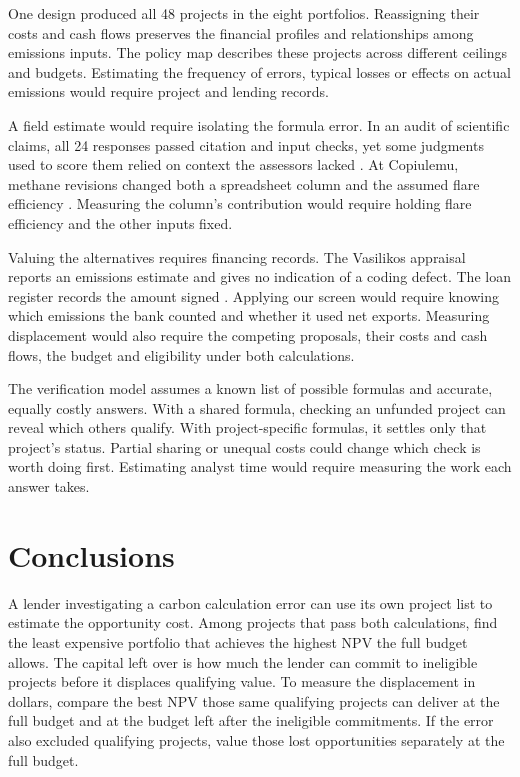 \documentclass[ijfs,article,submit,oneauthor]{Definitions/mdpi}
\begin{document}
One design produced all 48 projects in the eight portfolios. Reassigning their costs and cash flows preserves the financial profiles and relationships among emissions inputs. The policy map describes these projects across different ceilings and budgets. Estimating the frequency of errors, typical losses or effects on actual emissions would require project and lending records.

A field estimate would require isolating the formula error. In an audit of scientific claims, all 24 responses passed citation and input checks, yet some judgments used to score them relied on context the assessors lacked \citep{versions}. At Copiulemu, methane revisions changed both a spreadsheet column and the assumed flare efficiency \citep[pp.~9--11, 14]{sgs}. Measuring the column's contribution would require holding flare efficiency and the other inputs fixed.

Valuing the alternatives requires financing records. The Vasilikos appraisal reports an emissions estimate and gives no indication of a coding defect. The loan register records the amount signed \citep{eibscore,eibloan}. Applying our screen would require knowing which emissions the bank counted and whether it used net exports. Measuring displacement would also require the competing proposals, their costs and cash flows, the budget and eligibility under both calculations.

The verification model assumes a known list of possible formulas and accurate, equally costly answers. With a shared formula, checking an unfunded project can reveal which others qualify. With project-specific formulas, it settles only that project's status. Partial sharing or unequal costs could change which check is worth doing first. Estimating analyst time would require measuring the work each answer takes.

\section{Conclusions}
A lender investigating a carbon calculation error can use its own project list to estimate the opportunity cost. Among projects that pass both calculations, find the least expensive portfolio that achieves the highest NPV the full budget allows. The capital left over is how much the lender can commit to ineligible projects before it displaces qualifying value. To measure the displacement in dollars, compare the best NPV those same qualifying projects can deliver at the full budget and at the budget left after the ineligible commitments. If the error also excluded qualifying projects, value those lost opportunities separately at the full budget.
\end{document}
